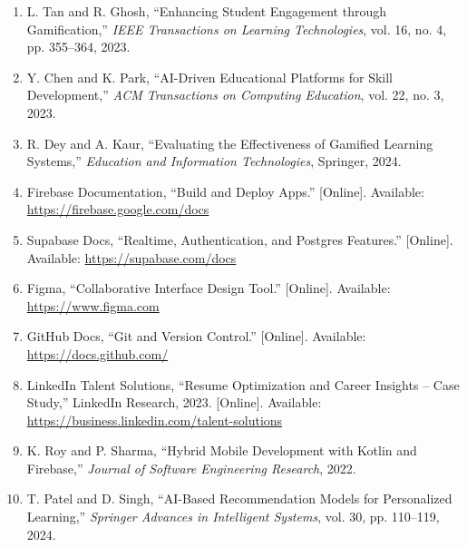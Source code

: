 \documentclass[12,Times new Roman,a4paper]{report}
\begin{document}
\begin{enumerate}
    \item L. Tan and R. Ghosh, “Enhancing Student Engagement through Gamification,” \textit{IEEE Transactions on Learning Technologies}, vol. 16, no. 4, pp. 355–364, 2023.
    \vspace{0.2cm}

    \item Y. Chen and K. Park, “AI-Driven Educational Platforms for Skill Development,” \textit{ACM Transactions on Computing Education}, vol. 22, no. 3, 2023.
    \vspace{0.2cm}

    \item R. Dey and A. Kaur, “Evaluating the Effectiveness of Gamified Learning Systems,” \textit{Education and Information Technologies}, Springer, 2024.
    \vspace{0.2cm}

    \item Firebase Documentation, “Build and Deploy Apps.” [Online]. Available: \url{https://firebase.google.com/docs}
    \vspace{0.2cm}

    \item Supabase Docs, “Realtime, Authentication, and Postgres Features.” [Online]. Available: \url{https://supabase.com/docs}
    \vspace{0.2cm}

    \item Figma, “Collaborative Interface Design Tool.” [Online]. Available: \url{https://www.figma.com}
    \vspace{0.2cm}

    \item GitHub Docs, “Git and Version Control.” [Online]. Available: \url{https://docs.github.com/}
    \vspace{0.2cm}

    \item LinkedIn Talent Solutions, “Resume Optimization and Career Insights – Case Study,” LinkedIn Research, 2023. [Online]. Available: \url{https://business.linkedin.com/talent-solutions}
    \vspace{0.2cm}

    \item K. Roy and P. Sharma, “Hybrid Mobile Development with Kotlin and Firebase,” \textit{Journal of Software Engineering Research}, 2022.
    \vspace{0.2cm}

    \item T. Patel and D. Singh, “AI-Based Recommendation Models for Personalized Learning,” \textit{Springer Advances in Intelligent Systems}, vol. 30, pp. 110–119, 2024.
    \vspace{0.2cm}


\end{enumerate}
\end{document}

